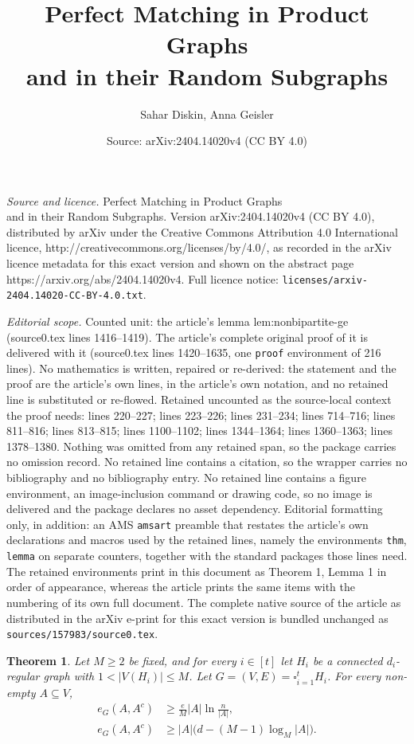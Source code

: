 \documentclass[10pt,a4paper]{amsart}
\title{\vspace{-1.5cm}Perfect Matching in Product Graphs\\ and in their Random Subgraphs}
\author{Sahar Diskin, Anna Geisler}
\date{Source: arXiv:2404.14020v4 (CC BY 4.0)}
\newtheorem{thm}{Theorem}
\begin{document}
\maketitle

\noindent\emph{Source and licence.} \vspace{-1.5cm}Perfect Matching in Product Graphs\\ and in their Random Subgraphs. Version arXiv:2404.14020v4 (CC BY 4.0), distributed by arXiv under the Creative Commons Attribution 4.0 International licence, http://creativecommons.org/licenses/by/4.0/, as recorded in the arXiv licence metadata for this exact version and shown on the abstract page https://arxiv.org/abs/2404.14020v4. Full licence notice: \texttt{licenses/arxiv-2404.14020-CC-BY-4.0.txt}.\par\smallskip

\noindent\textit{Editorial scope.} Counted unit: the article's lemma lem:nonbipartite-ge (source0.tex lines 1416--1419). The article's complete original proof of it is delivered with it (source0.tex lines 1420--1635, one \texttt{proof} environment of 216 lines). No mathematics is written, repaired or re-derived: the statement and the proof are the article's own lines, in the article's own notation, and no retained line is substituted or re-flowed.  Retained uncounted as the source-local context the proof needs: lines 220--227; lines 223--226; lines 231--234; lines 714--716; lines 811--816; lines 813--815; lines 1100--1102; lines 1344--1364; lines 1360--1363; lines 1378--1380.  Nothing was omitted from any retained span, so the package carries no omission record.  No retained line contains a citation, so the wrapper carries no bibliography and no bibliography entry.  No retained line contains a figure environment, an image-inclusion command or drawing code, so no image is delivered and the package declares no asset dependency.  Editorial formatting only, in addition: an AMS \texttt{amsart} preamble that restates the article's own declarations and macros used by the retained lines, namely the environments \texttt{thm}, \texttt{lemma} on separate counters, together with the standard packages those lines need.  The retained environments print in this document as Theorem 1, Lemma 1 in order of appearance, whereas the article prints the same items with the numbering of its own full document.  The complete native source of the article as distributed in the arXiv e-print for this exact version is bundled unchanged as \texttt{sources/157983/source0.tex}.
\begin{thm}\label{th:expansion}
Let $M\ge2$ be fixed, and for every $i\in[t]$ let $H_i$ be a connected $d_i$-regular graph with $1<|V(H_i)|\le M$.
Let $G=(V, E)=\square_{i=1}^tH_i$. For every non-empty $A\subseteq V$,
\begin{align}
  e_G(A,A^c)&\ge \frac{e}{M}|A|\ln\frac{n}{|A|},\label{eq:expansion-log}\\
  e_G(A,A^c)&\ge |A|\bigl(d-(M-1)\log_M|A|\bigr).\label{eq:expansion-local}
\end{align}
\end{thm}
\end{document}
